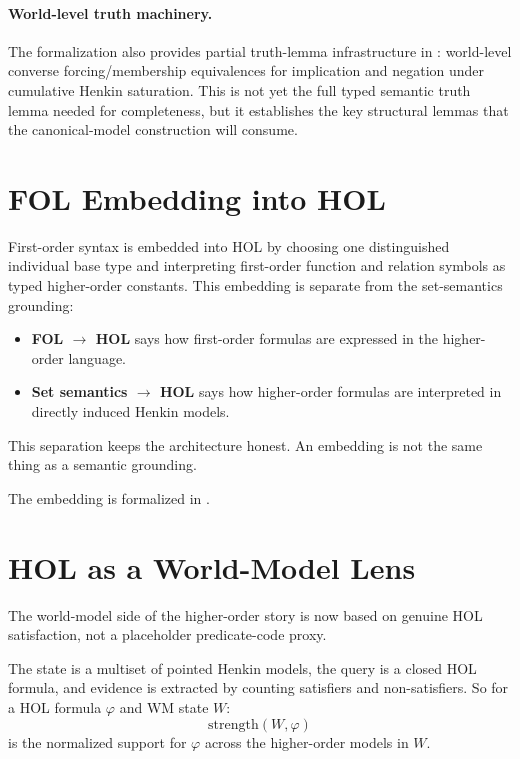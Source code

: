 \documentclass[11pt,openany]{report}
\begin{document}
\paragraph{World-level truth machinery.}
The formalization also provides partial truth-lemma infrastructure in
: world-level converse
forcing/membership equivalences for implication and negation under
cumulative Henkin saturation.  This is not yet the full typed semantic
truth lemma needed for completeness, but it establishes the key
structural lemmas that the canonical-model construction will consume.

\section{FOL Embedding into HOL}

First-order syntax is embedded into HOL by choosing one distinguished
individual base type and interpreting first-order function and relation
symbols as typed higher-order constants.  This embedding is separate from the
set-semantics grounding:
\begin{itemize}
\item \textbf{FOL $\to$ HOL} says how first-order formulas are expressed in the
  higher-order language.
\item \textbf{Set semantics $\to$ HOL} says how higher-order formulas are
  interpreted in directly induced Henkin models.
\end{itemize}

This separation keeps the architecture honest.  An embedding is not the same
thing as a semantic grounding.

The embedding is formalized in
.

\section{HOL as a World-Model Lens}

The world-model side of the higher-order story is now based on genuine HOL
satisfaction, not a placeholder predicate-code proxy.

The state is a multiset of pointed Henkin models, the query is a closed HOL
formula, and evidence is extracted by counting satisfiers and non-satisfiers.
So for a HOL formula $\varphi$ and WM state $W$:
\[
  \mathrm{strength}(W,\varphi)
\]
is the normalized support for $\varphi$ across the higher-order models in
$W$.
\end{document}
